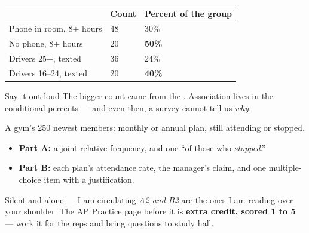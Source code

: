 \documentclass[aspectratio=169, 11pt]{beamer}
\begin{document}
\begin{frame}[t, plain]
  \vspace{6pt}
  \renewcommand{\arraystretch}{1.3}
  \begin{tabularx}{\textwidth}{l Y Y}
    & \textbf{Count} & \textbf{Percent of the group} \\ \hline
    Phone in room, 8+ hours & 48 & 30\% \\
    No phone, 8+ hours & 20 & \textbf{50\%} \\
    Drivers 25+, texted & 36 & 24\% \\
    Drivers 16--24, texted & 20 & \textbf{40\%} \\
  \end{tabularx}
  \vspace{10pt}
  \begin{block}{Say it out loud}
    The bigger count came from the . Association lives in the conditional
    percents --- and even then, a survey cannot tell us \emph{why}.
  \end{block}
\end{frame}

\begin{frame}[t, plain]
  A gym's 250 newest members: monthly or annual plan, still attending or stopped.
  \begin{itemize}\setlength{\itemsep}{4pt}
    \item \textbf{Part A:} a joint relative frequency, and one ``of those who \emph{stopped}.''
    \item \textbf{Part B:} each plan's attendance rate, the manager's claim, and one
          multiple-choice item with a justification.
  \end{itemize}
  \begin{block}{Silent and alone --- I am circulating}
    \emph{A2 and B2} are the ones I am reading over your shoulder. The AP Practice page before
    it is \textbf{extra credit, scored 1 to 5} --- work it for the reps and bring questions to study hall.
  \end{block}
\end{frame}
\end{document}
